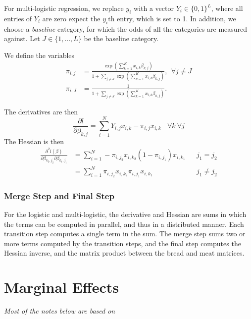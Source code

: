 For multi-logistic regression,  we replace $y_i$ with a vector $Y_i \in \{0,1\}^L$, where all entries of $Y_i$ are zero expect the $y_i$th entry, which is set to 1.  In addition, we choose a \textit{baseline} category, for which the odds of all the categories are measured against.  Let $J \in \{1, \dots, L \}$ be the baseline category.

We define the variables
\begin{align}
\pi_{i,j} &= \frac{\exp\left(\sum_{k=1}^K x_{i,k} \beta_{k,j} \right)}{1 + \sum_{j\ne J} \exp \left(\sum_{k=1}^K x_{i,k} \beta_{k,j} \right)}, \ \ \forall j \ne J\\
\pi_{i,J} &= \frac{1}{1 + \sum_{j\ne J} \exp \left(\sum_{k=1}^K x_{i,k} \beta_{k,j} \right)}.
\end{align}

The derivatives are then
\begin{equation}\label{eq:first_derivative}
\frac{\partial l}{\partial \beta_{k,j}} = \sum_{i=1}^{N} Y_{i,j}x_{i,k} - \pi_{i,j}x_{i,k} \ \ \ \ \forall k \  \forall j
\end{equation}
The Hessian is then
\begin{align}\label{eq:second_derivative}
\frac{\partial^2 l({\beta})}{\partial \beta_{k_2,j_2} \partial \beta_{k_1,j_1}}
&= \sum_{i=1}^{N} -\pi_{i,j_2}x_{i,k_2}(1-\pi_{i,j_1})x_{i,k_1} &&j_1 = j_2 \\
&= \sum_{i=1}^{N} \pi_{i,j_2}x_{i,k_2}\pi_{i,j_1}x_{i,k_1} &&j_1 \neq j_2
\end{align}

\subsubsection{Merge Step and Final Step}

For the logistic and multi-logistic, the derivative and Hessian are sums in
which the terms can be computed in parallel, and thus in a distributed manner.
Each transition step computes a single term in the sum.  The merge step sums two
or more terms computed by the transition steps, and the final step computes the
Hessian inverse, and the matrix product between the bread and meat matrices.


\section{Marginal Effects} %
\label{sub:marginal_effects}
\textit{Most of the notes below are based on~\cite{diekmann2008}}

